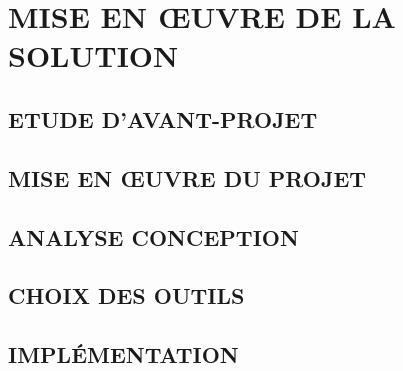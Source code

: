 \chapter{MISE EN ŒUVRE DE LA SOLUTION}



\section{ETUDE D’AVANT-PROJET}
\section{MISE EN ŒUVRE DU PROJET}
\section{ANALYSE CONCEPTION}
\section{CHOIX DES OUTILS}
\section{IMPLÉMENTATION}






